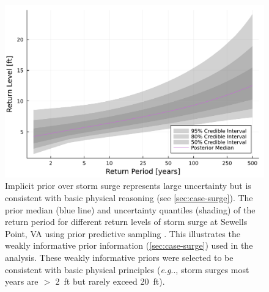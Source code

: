 \documentclass[11pt]{article}
\makeatletter
\DeclareRobustCommand\onedot{\futurelet\@let@token\@onedot}
\def\@onedot{\ifx\@let@token.\else.\null\fi\xspace}
\def\eg{\emph{e.g}\onedot} \def\Eg{\emph{E.g}\onedot}
\DeclareRobustCommand\onedot{\futurelet\@let@token\@onedot}
\def\@onedot{\ifx\@let@token.\else.\null\fi\xspace}
\def\eg{\emph{e.g}\onedot} \def\Eg{\emph{E.g}\onedot}
\makeatother
\begin{document}
\begin{figure}
    \centering
    \includegraphics[width=\textwidth]{surge-prior-return}
    \caption{
        Implicit prior over storm surge represents large uncertainty but is consistent with basic physical reasoning (see \cref{sec:case-surge}).
        The prior median (blue line) and uncertainty quantiles (shading) of the return period for different return levels of storm surge at Sewells Point, VA using prior predictive sampling \citep{gelman_workflow:2020}.
        This illustrates the weakly informative prior information (\cref{sec:case-surge}) used in the analysis.
        These weakly informative priors were selected to be consistent with basic physical principles (\eg, storm surges most years are $>$ \SI{2}{ft} but rarely exceed \SI{20}{ft}).
    }\label{fig:surge-prior-return}
\end{figure}
\end{document}
